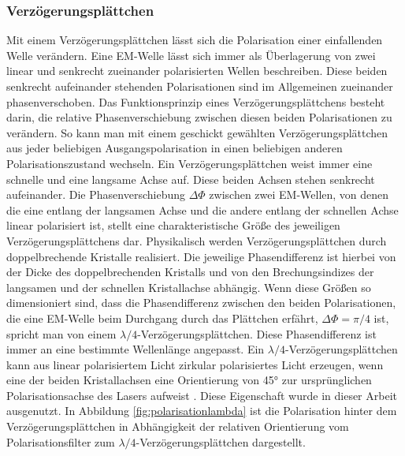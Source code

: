 \documentclass[titlepage,  ngerman]{article}
\begin{document}
	\subsubsection{Verzögerungsplättchen}
	Mit einem Verzögerungsplättchen lässt sich die Polarisation einer einfallenden Welle verändern. Eine EM-Welle lässt sich immer als Überlagerung von zwei linear und senkrecht zueinander polarisierten Wellen beschreiben. Diese beiden senkrecht aufeinander stehenden Polarisationen sind im Allgemeinen zueinander phasenverschoben. Das Funktionsprinzip eines Verzögerungsplättchens besteht darin, die relative Phasenverschiebung zwischen diesen beiden Polarisationen zu verändern. So kann man mit einem geschickt gewählten Verzögerungsplättchen aus jeder beliebigen Ausgangspolarisation in einen beliebigen anderen Polarisationszustand wechseln. Ein Verzögerungsplättchen weist immer eine schnelle und eine langsame Achse auf. Diese beiden Achsen stehen senkrecht aufeinander. Die Phasenverschiebung $\Delta\Phi$ zwischen zwei EM-Wellen, von denen die eine entlang der langsamen Achse und die andere entlang der schnellen Achse linear polarisiert ist, stellt eine charakteristische Größe des jeweiligen Verzögerungsplättchens dar. Physikalisch  werden Verzögerungsplättchen durch doppelbrechende Kristalle realisiert. Die jeweilige Phasendifferenz ist hierbei von der Dicke des doppelbrechenden Kristalls und von den Brechungsindizes der langsamen und der schnellen Kristallachse abhängig. Wenn diese Größen so dimensioniert sind, dass die Phasendifferenz zwischen den beiden Polarisationen, die eine EM-Welle beim Durchgang durch das Plättchen erfährt, $\Delta \Phi = \pi /4 $ ist, spricht man von einem  $\lambda /4$-Verzögerungsplättchen. Diese Phasendifferenz ist immer an eine bestimmte Wellenlänge angepasst.  Ein $\lambda /4$-Verzögerungsplättchen kann aus linear polarisiertem Licht zirkular polarisiertes Licht erzeugen, wenn eine der beiden Kristallachsen eine Orientierung von 45° zur ursprünglichen Polarisationsachse des Lasers aufweist \cite{Hecht.2018}. Diese Eigenschaft wurde in dieser Arbeit ausgenutzt. In Abbildung \ref{fig:polarisationlambda} ist die Polarisation hinter dem Verzögerungsplättchen in Abhängigkeit der relativen Orientierung vom Polarisationsfilter zum $\lambda /4$-Verzögerungsplättchen dargestellt. 
\end{document}
